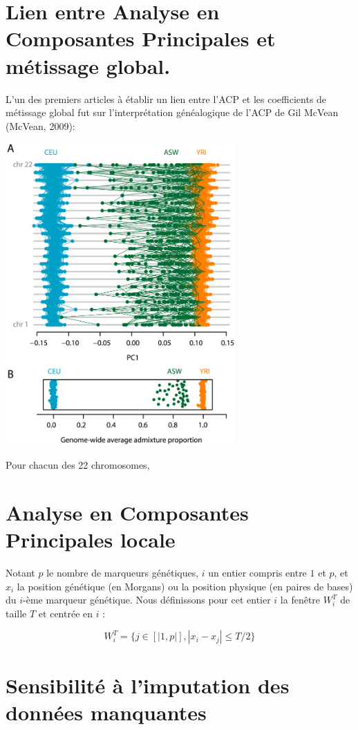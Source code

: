 \documentclass[12pt,twoside]{reedthesis}
\theoremstyle{definition}
\theoremstyle{definition}
\theoremstyle{remark}
\begin{document}
  \section{Lien entre Analyse en Composantes Principales et métissage
  global.}\label{lien-entre-analyse-en-composantes-principales-et-metissage-global.}
  
  L'un des premiers articles à établir un lien entre l'ACP et les
  coefficients de métissage global fut sur l'interprétation généalogique
  de l'ACP de Gil McVean (McVean, 2009):
  
  \includegraphics[width=250pt]{figure/mcvean.png}
  
  Pour chacun des 22 chromosomes,
  
  \section{Analyse en Composantes Principales
  locale}\label{analyse-en-composantes-principales-locale}
  
  Notant \(p\) le nombre de marqueurs génétiques, \(i\) un entier compris
  entre \(1\) et \(p\), et \(x_i\) la position génétique (en Morgans) ou
  la position physique (en paires de bases) du \(i\)-ème marqueur
  génétique. Nous définissons pour cet entier \(i\) la fenêtre \(W_i^T\)
  de taille \(T\) et centrée en \(i\) :
  
  \[W_i^T = \{ j \in [|1, p|], |x_i - x_j| \leq T/2 \}\]
  
  \section{Sensibilité à l'imputation des données
  manquantes}\label{sensibilite-a-limputation-des-donnees-manquantes}
  
\end{document}
